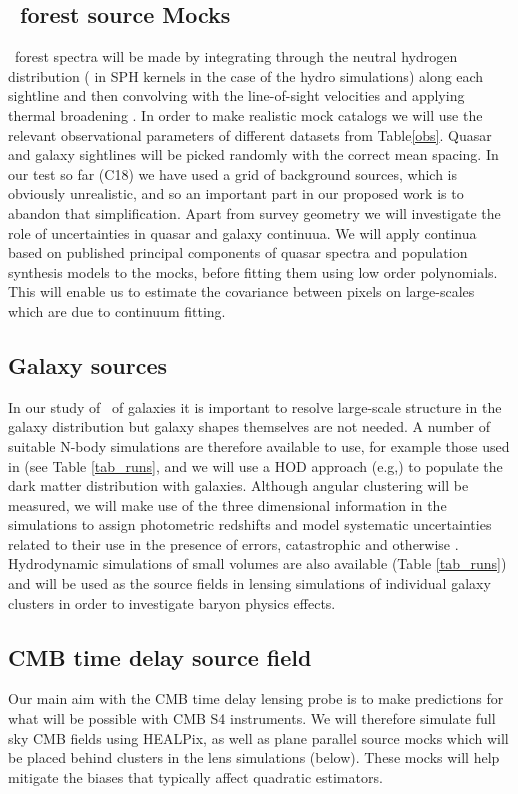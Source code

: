 \subsection{\lya\ forest source Mocks}
\lya\ forest spectra will be made by integrating through the
neutral hydrogen distribution ( in SPH kernels in the case of the hydro
simulations)
along each sightline and then convolving with the line-of-sight velocities
and applying thermal broadening \citep{hernquist1996}.
 In order to make realistic
mock catalogs we will use the relevant observational parameters
of different datasets from Table\ref{obs}. Quasar and galaxy sightlines will
be picked randomly with the correct mean spacing. In our test so far
(C18) we have used a grid of background sources, which is obviously
unrealistic, and so an important part in our proposed work is to abandon
that simplification. Apart from survey geometry we will investigate
the role of uncertainties in  quasar and galaxy continuua. We will 
apply continua based on published principal components
of quasar spectra \citep{leedr9} and population synthesis models
to the mocks, before fitting them using low order polynomials. This will
enable us to estimate the covariance between pixels on large-scales which
are due to continuum fitting.


\subsection{Galaxy sources}
\label{galaxysourcesims}
In our study of \atf\ of galaxies
 it is important to resolve large-scale structure
in the galaxy distribution but galaxy shapes themselves are not needed.
A number of suitable N-body simulations are therefore 
available to use, for example
those used in \cite{zhu2017} (see Table \ref{tab_runs}, and we will use a HOD 
approach (e.g,) to populate the dark matter distribution with galaxies.
Although angular clustering will be measured, we will make use of the 
three dimensional information in the simulations to assign photometric
redshifts and model systematic uncertainties related to their use in 
the presence of errors, catastrophic and otherwise \citep{hearin2010}.
Hydrodynamic simulations of small volumes are also available 
(Table \ref{tab_runs}) and
will be used as the source fields in lensing simulations of individual
galaxy clusters in order to investigate baryon physics effects.

\subsection{CMB time delay source field}
Our main aim with the CMB time delay lensing probe is to make predictions
for what will be possible with CMB S4 instruments. We will therefore
simulate full sky CMB fields using HEALPix, as well as plane parallel
source mocks which will be placed behind clusters in the lens simulations
(below). These mocks will help mitigate the biases that typically affect quadratic estimators.


